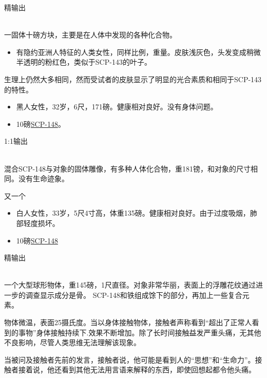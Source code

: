 精输出

\\
一固体十磅方块，主要是在人体中发现的各种化合物。

\begin{itemize}
\item 有隐约亚洲人特征的人类女性，同样比例，重量。皮肤浅灰色，头发变成稍微半透明的粉红色，类似于SCP-143的叶子。
\end{itemize}

生理上仍然大多相同，然而受试者的皮肤显示了明显的光合素质和相同于SCP-143的特性。




\begin{itemize}
\item 黑人女性，32岁，6尺，171磅。健康相对良好。没有身体问题。
\item 10磅\hyperref[chap:SCP-148]{SCP-148}。
\end{itemize}

1:1输出

\\
混合SCP-148与对象的固体雕像，有多种人体化合物，重181镑，和对象的尺寸相同。没有生命迹象。

又一个



\begin{itemize}
\item 白人女性，33岁，5尺4寸高，体重135磅。健康相对良好。由于过度吸烟，肺部轻度损坏。
\item 10磅\hyperref[chap:SCP-148]{SCP-148}
\end{itemize}

精输出

\\
一个大型球形物体，重145磅，1尺直径。对象非常华丽，表面上的浮雕花纹通过进一步的调查显示成分是骨。 SCP-148和铁组成馀下的部分，再加上一些复合元素。

物体微温，表面25摄氏度。当以身体接触物体，接触者声称看到“超出了正常人看到的事物”身体接触持续下.效果不断增加。除了长时间接触益发严重头痛，无其他不良影响，尽管人类思维无法理解该现象。

当被问及接触者先前的发言，接触者说，他可能是看到人的“思想”和“生命力”。接触者接着说，他还看到其他无法用言语来解释的东西，即使回想起都令他头痛。

